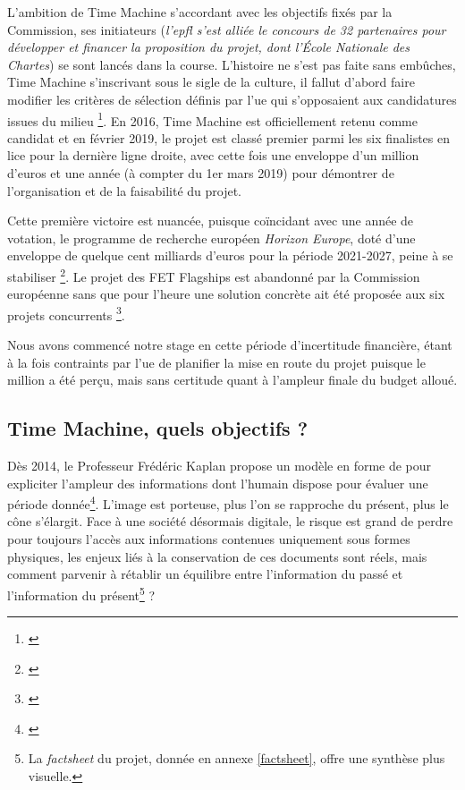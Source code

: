 L'ambition de Time Machine s'accordant avec les objectifs fixés par la Commission, ses initiateurs (\textit{l'\gls{epfl} s'est alliée le concours de 32 partenaires pour développer et financer la proposition du projet, dont l'École Nationale des Chartes}) se sont lancés dans la course. L'histoire ne s'est pas faite sans embûches, Time Machine s'inscrivant sous le sigle de la culture, il fallut d'abord faire modifier les critères de sélection définis par l'\gls{ue} qui s'opposaient aux candidatures issues du milieu \footnote{\cite{rts_invite_nodate}}. En 2016, Time Machine est officiellement retenu comme candidat et en février 2019, le projet est classé premier parmi les six finalistes en lice pour la dernière ligne droite, avec cette fois une enveloppe d'un million d'euros et une année (à compter du 1er mars 2019) pour démontrer de l'organisation et de la faisabilité du projet.

Cette première victoire est nuancée, puisque coïncidant avec une année de votation, le programme de recherche européen \textit{Horizon Europe}, doté d'une enveloppe de quelque cent milliards d'euros pour la période 2021-2027, peine à se stabiliser \footnote{\cite{noauthor_crise_nodate}}. Le projet des FET Flagships est abandonné par la Commission européenne sans que pour l'heure une solution concrète ait été proposée aux six projets concurrents \footnote{\cite{rts_coup_2019}}. 

Nous avons commencé notre stage en cette période d'incertitude financière, étant à la fois contraints par l'\gls{ue} de planifier la mise en route du projet puisque le million a été perçu, mais sans certitude quant à l'ampleur finale du budget alloué.

\subsection{Time Machine, quels objectifs ?}

Dès 2014, le Professeur Frédéric Kaplan propose un modèle en forme de  pour expliciter l'ampleur des informations dont l'humain dispose pour évaluer une période donnée\footnote{\cite{ted_frederic_nodate}}. L'image est porteuse, plus l'on se rapproche du présent, plus le cône s'élargit. Face à une société désormais digitale, le risque est grand de perdre pour toujours l'accès aux informations contenues uniquement sous formes physiques, les enjeux liés à la conservation de ces documents sont réels, mais comment parvenir à rétablir un équilibre entre l'information du passé et l'information du présent\footnote{La \textit{factsheet} du projet, donnée en annexe \ref{factsheet}, offre une synthèse plus visuelle.} ? 

